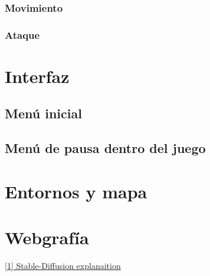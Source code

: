 \documentclass[12pt,spanish]{article}
\begin{document}
\subsubsection{Movimiento}

\subsubsection{Ataque}

\newpage

\section{Interfaz}

\subsection{Menú inicial}

\subsection{Menú de pausa dentro del juego}

\newpage

\section{Entornos y mapa}

\newpage

\section{Webgrafía}

\href{https://www.youtube.com/watch?v=dQw4w9WgXcQ}{[1] Stable-Diffusion explanaition}\\
\end{document}
